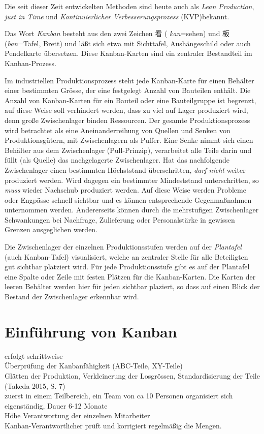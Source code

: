 Die seit dieser Zeit entwickelten Methoden sind heute auch als 
\emph{Lean Production}, \emph{just in Time} und 
\emph{Kontinuierlicher Verbesserungsprozess} (KVP)bekannt.

Das Wort \emph{Kanban} besteht aus den zwei Zeichen {\CN 看} ( \emph{kan}=sehen)
 und {\CN 板} (\emph{ban}=Tafel, Brett) und läßt sich etwa mit Sichttafel, 
 Aushängeschild oder auch Pendelkarte übersetzen.
Diese Kanban-Karten sind ein zentraler Bestandteil im Kanban-Prozess.

Im industriellen Produktionsprozess steht jede Kanban-Karte für einen Behälter einer bestimmten Grösse, der eine festgelegt Anzahl von Bauteilen enthält.
Die Anzahl von Kanban-Karten für ein Bauteil oder eine Bauteilgruppe ist begrenzt, auf diese Weise soll verhindert werden, dass zu viel auf Lager produziert wird, denn große Zwischenlager binden Ressourcen.
Der gesamte Produktionsprozess wird betrachtet als eine Aneinanderreihung von Quellen und Senken von Produktionsgütern, mit Zwischenlagern als Puffer.
Eine Senke nimmt sich einen Behälter aus dem Zwischenlager (Pull-Prinzip), verarbeitet alle Teile darin und füllt (als Quelle) das nachgelagerte Zwischenlager.
Hat das nachfolgende Zwischenlager einen bestimmten Höchststand überschritten, \emph{darf nicht} weiter produziert werden.
Wird dagegen ein bestimmter Mindeststand unterschritten, so \emph{muss} wieder Nachschub produziert werden.
Auf diese Weise werden Probleme oder Engpässe schnell sichtbar und es können entsprechende Gegenmaßnahmen unternommen werden.
Andererseits können durch die mehrstufigen Zwischenlager Schwankungen bei Nachfrage, Zulieferung oder Personalstärke in gewissen Grenzen ausgeglichen werden.

Die Zwischenlager der einzelnen Produktionsstufen werden auf der \emph{Plantafel} (auch Kanban-Tafel) visualisiert, welche an zentraler Stelle für alle Beteiligten gut sichtbar platziert wird.
Für jede Produktionsstufe gibt es auf der Plantafel eine Spalte oder Zeile mit festen Plätzen für die Kanban-Karten.
Die Karten der leeren Behälter werden hier für jeden sichtbar plaziert, so dass auf einen Blick der Bestand der Zwischenlager erkennbar wird.


\section{Einführung von Kanban}
erfolgt schrittweise\\
Überprüfung der Kanbanfähigkeit (ABC-Teile, XY-Teile)\\
Glätten der Produktion, Verkleinerung der Losgrössen, Standardisierung der Teile (Takeda 2015, S. 7)\\
zuerst in einem Teilbereich, ein Team von ca 10 Personen organisiert sich eigenständig, Dauer 6-12 Monate\\
Höhe Verantwortung der einzelnen Mitarbeiter\\
Kanban-Verantwortlicher prüft und korrigiert regelmäßig die Mengen.\\

